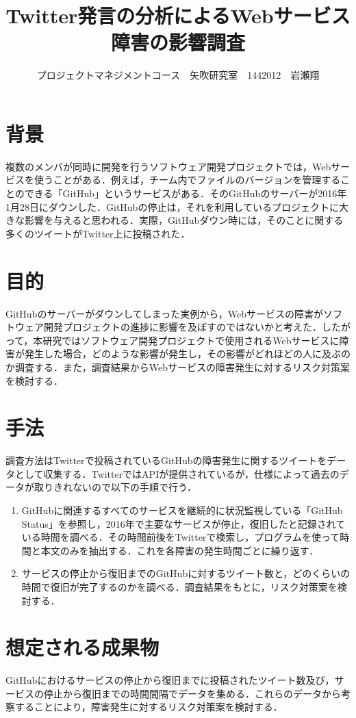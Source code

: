\documentclass[uplatex,twocolumn,dvipdfmx]{jsarticle}
\title{\vspace{-5mm}\fontsize{14pt}{0pt}\selectfont Twitter発言の分析によるWebサービス障害の影響調査}
\author{\normalsize プロジェクトマネジメントコース　矢吹研究室　1442012　岩瀬翔}
\date{}
\begin{document}
\fontsize{10.5pt}{\baselineskip}\selectfont
\maketitle





\section{背景}
複数のメンバが同時に開発を行うソフトウェア開発プロジェクトでは，Webサービスを使うことがある．例えば，チーム内でファイルのバージョンを管理することのできる「GitHub」というサービスがある\cite{01}．そのGitHubのサーバーが2016年1月28日にダウンした．GitHubの停止は，それを利用しているプロジェクトに大きな影響を与えると思われる．実際，GitHubダウン時には，そのことに関する多くのツイートがTwitter上に投稿された\cite{02}．
\section{目的}
GitHubのサーバーがダウンしてしまった実例から，Webサービスの障害がソフトウェア開発プロジェクトの進捗に影響を及ぼすのではないかと考えた．したがって，本研究ではソフトウェア開発プロジェクトで使用されるWebサービスに障害が発生した場合，どのような影響が発生し，その影響がどれほどの人に及ぶのか調査する．また，調査結果からWebサービスの障害発生に対するリスク対策案を検討する．
\section{手法}
調査方法はTwitterで投稿されているGitHubの障害発生に関するツイートをデータとして収集する．TwitterではAPIが提供されているが，仕様によって過去のデータが取りきれないので以下の手順で行う．
\begin{enumerate}
 \item GitHubに関連するすべてのサービスを継続的に状況監視している「GitHub Status」を参照し，2016年で主要なサービスが停止，復旧したと記録されている時間を調べる．その時間前後をTwitterで検索し，プログラムを使って時間と本文のみを抽出する．これを各障害の発生時間ごとに繰り返す\cite{03}．
 \item サービスの停止から復旧までのGitHubに対するツイート数と，どのくらいの時間で復旧が完了するのかを調べる．調査結果をもとに，リスク対策案を検討する．
\end{enumerate}
\section{想定される成果物}
GitHubにおけるサービスの停止から復旧までに投稿されたツイート数及び，サービスの停止から復旧までの時間間隔でデータを集める．これらのデータから考察することにより，障害発生に対するリスク対策案を検討する．
\end{document}
